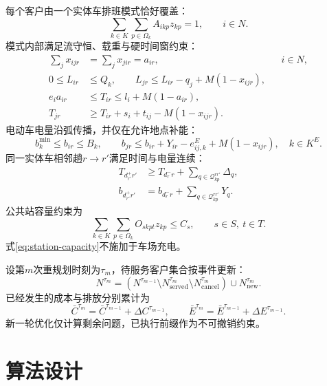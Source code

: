 每个客户由一个实体车排班模式恰好覆盖：
\begin{equation}
\sum_{k\in K}\sum_{p\in\Omega_k}A_{ikp}z_{kp}=1,\qquad i\in N.
\label{eq:coverage}
\end{equation}
模式内部满足流守恒、载重与硬时间窗约束：
\begin{align}
\sum_jx_{ijr}&=\sum_jx_{jir}=a_{ir}, && i\in N,\label{eq:flow}\\
0\leq L_{ir}&\leq Q_k,\qquad L_{jr}\leq L_{ir}-q_j+M(1-x_{ijr}),\label{eq:load}\\
e_i a_{ir}&\leq T_{ir}\leq l_i+M(1-a_{ir}),\nonumber\\
T_{jr}&\geq T_{ir}+s_i+t_{ij}-M(1-x_{ijr}).\label{eq:time-window}
\end{align}
电动车电量沿弧传播，并仅在允许地点补能：
\begin{equation}
b_k^{\min}\leq b_{ir}\leq B_k,\qquad
b_{jr}\leq b_{ir}+Y_{ir}-e^E_{ij,k}+M(1-x_{ijr}),\quad k\in K^E.
\label{eq:soc}
\end{equation}
同一实体车相邻趟$r\rightarrow r'$满足时间与电量连续：
\begin{align}
T_{d^+_{r'}r'}&\geq T_{d^-_rr}+\sum_{q\in\mathcal Q_{kp}^{rr'}}\Delta_q,\label{eq:trip-time}\\
b_{d^+_{r'}r'}&=b_{d^-_rr}+\sum_{q\in\mathcal Q_{kp}^{rr'}}Y_q.\label{eq:trip-energy}
\end{align}
公共站容量约束为
\begin{equation}
\sum_{k\in K}\sum_{p\in\Omega_k}O_{skpt}z_{kp}\leq C_s,\qquad s\in S,\ t\in T.
\label{eq:station-capacity}
\end{equation}
式\eqref{eq:station-capacity}不施加于车场充电。

设第$m$次重规划时刻为$\tau_m$，待服务客户集合按事件更新：
\begin{equation}
N^{\tau_m}=\left(N^{\tau_{m-1}}\setminus N_{\mathrm{served}}^{\tau_m}\setminus N_{\mathrm{cancel}}^{\tau_m}\right)\cup N_{\mathrm{new}}^{\tau_m}.
\label{eq:dynamic-set}
\end{equation}
已经发生的成本与排放分别累计为
\begin{equation}
\bar C^{\tau_m}=\bar C^{\tau_{m-1}}+\Delta C^{\tau_{m-1}},\qquad
\bar E^{\tau_m}=\bar E^{\tau_{m-1}}+\Delta E^{\tau_{m-1}}.
\label{eq:dynamic-account}
\end{equation}
新一轮优化仅计算剩余问题，已执行前缀作为不可撤销约束。

\section{算法设计}

